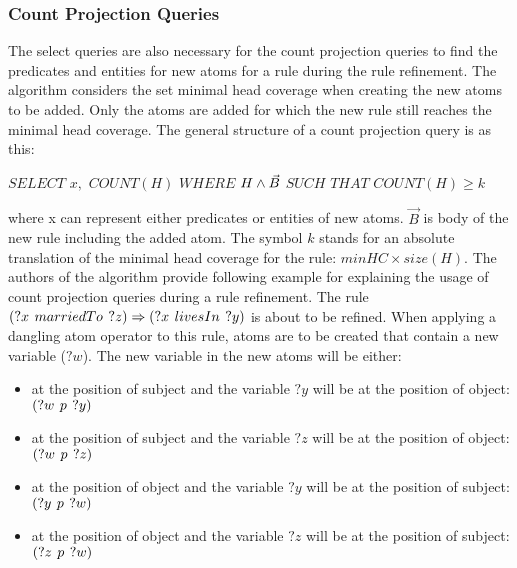 \subsubsection{Count Projection Queries}

The select queries are also necessary for the count projection queries to find the predicates and entities for new atoms for a rule during the rule refinement. The algorithm considers the set minimal head coverage when creating the new atoms to be added. Only the atoms are added for which the new rule still reaches the minimal head coverage. The general structure of a count projection query is as this:

$SELECT$ $x,$ $COUNT(H)$ $WHERE$ $H \land \vec{B}\\$
$SUCH$ $THAT$ $COUNT(H)\geq k$

where x can represent either predicates or entities of new atoms. $\vec{B}$ is body of the new rule including the added atom. The symbol $k$ stands for an absolute translation of the minimal head coverage for the rule: $minHC \times size(H)$. The authors of the algorithm provide following example for explaining the usage of count projection queries during a rule refinement. The rule $(?x\hspace{0.4em}marriedTo\hspace{0.4em}?z) \Rightarrow (?x\hspace{0.4em}livesIn\hspace{0.4em}?y)$ is about to be refined. When applying a dangling atom operator to this rule, atoms are to be created that contain a new variable ($?w$). The new variable in the new atoms will be either:

\begin{itemize}
    \item at the position of subject and the variable $?y$ will be at the position of object: $(?w\hspace{0.4em}p\hspace{0.4em}?y)$
    \item at the position of subject and the variable $?z$ will be at the position of object: $(?w\hspace{0.4em}p\hspace{0.4em}?z)$
    \item at the position of object and the variable $?y$ will be at the position of subject: $(?y\hspace{0.4em}p\hspace{0.4em}?w)$
    \item at the position of object and the variable $?z$ will be at the position of subject: $(?z\hspace{0.4em}p\hspace{0.4em}?w)$
\end{itemize}

